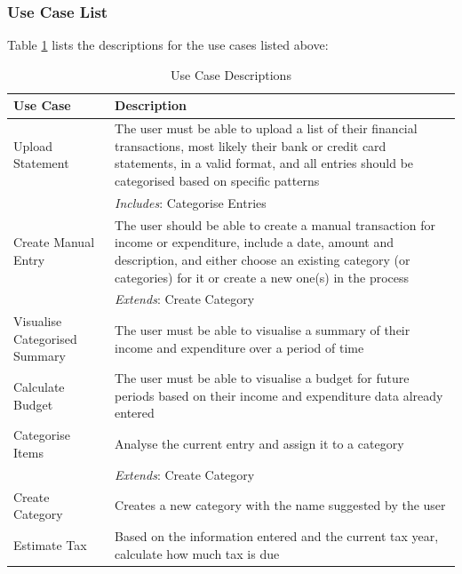 \subsubsection{Use Case List} \label{sec:Requirements.FunctionalRequirements.UseCaseList}
Table \ref{tab:UseCaseDescriptions} lists the descriptions for the use cases
listed above:
\begin{table}[ht!]
  \centering
  \begin{tabular}{|p{4cm}|p{12cm}|}
    \hline
    \textbf{Use Case}&\textbf{Description}\\
    \hline
    Upload Statement&The user must be able to upload a list of their
                     financial transactions, most likely their bank
                     or credit card statements, in a valid format, and all
                     entries should be categorised based on specific patterns\\
                    &\emph{Includes}: Categorise Entries\\
    \hline
    Create Manual Entry&The user should be able to create a manual transaction for
                        income or expenditure, include a date, amount and
                        description, and either choose an existing category (or
                        categories) for it or create a new one(s) in the
                        process\\
                        &\emph{Extends}: Create Category\\
    \hline
    Visualise Categorised Summary&The user must be able to visualise
                                  a summary of their income and expenditure
                                  over a period of time\\
    \hline
    Calculate Budget&The user must be able to visualise a budget for future
                     periods based on their income and expenditure data 
                     already entered\\
    \hline
    Categorise Items&Analyse the current entry and assign it to a category\\
                    &\emph{Extends}: Create Category\\
    \hline
    Create Category&Creates a new category with the name suggested by the
                        user\\
    \hline
    Estimate Tax&Based on the information entered and the current tax year,
                 calculate how much tax is due\\
    \hline
  \end{tabular}
  \caption{Use Case Descriptions} \label{tab:UseCaseDescriptions}
\end{table}
\FloatBarrier


